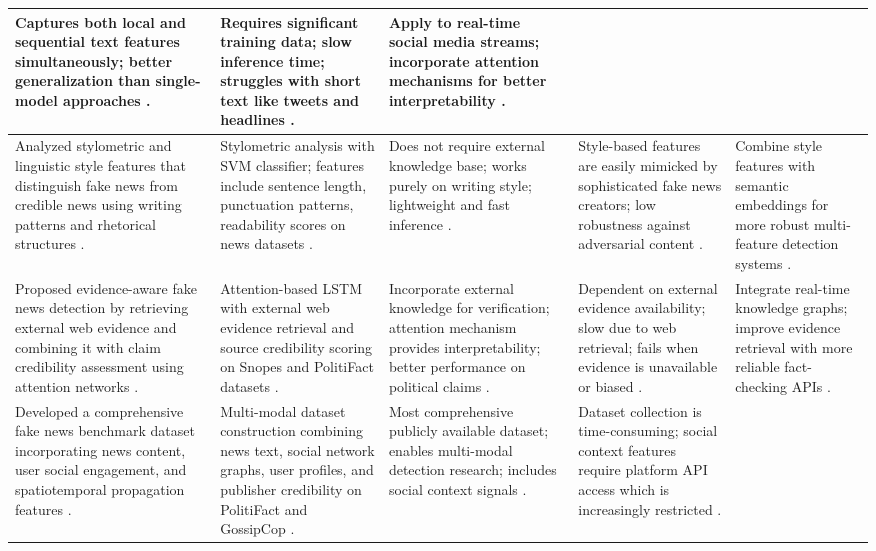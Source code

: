 \begin{longtable}{|p{}|p{}|p{}|p{}|p{}|}
Captures both local and sequential text features simultaneously; better generalization than single-model approaches \cite{Nasir2021FakeNews}. &
Requires significant training data; slow inference time; struggles with short text like tweets and headlines \cite{Nasir2021FakeNews}. &
Apply to real-time social media streams; incorporate attention mechanisms for better interpretability \cite{Nasir2021FakeNews}. \\ \hline
Analyzed stylometric and linguistic style features that distinguish fake news from credible news using writing patterns and rhetorical structures \cite{Przybyla2020Capturing}. &
Stylometric analysis with SVM classifier; features include sentence length, punctuation patterns, readability scores on news datasets \cite{Przybyla2020Capturing}. &
Does not require external knowledge base; works purely on writing style; lightweight and fast inference \cite{Przybyla2020Capturing}. &
Style-based features are easily mimicked by sophisticated fake news creators; low robustness against adversarial content \cite{Przybyla2020Capturing}. &
Combine style features with semantic embeddings for more robust multi-feature detection systems \cite{Przybyla2020Capturing}. \\ \hline
Proposed evidence-aware fake news detection by retrieving external web evidence and combining it with claim credibility assessment using attention networks \cite{Popat2019DeClarE}. &
Attention-based LSTM with external web evidence retrieval and source credibility scoring on Snopes and PolitiFact datasets \cite{Popat2019DeClarE}. &
Incorporate external knowledge for verification; attention mechanism provides interpretability; better performance on political claims \cite{Popat2019DeClarE}. &
Dependent on external evidence availability; slow due to web retrieval; fails when evidence is unavailable or biased \cite{Popat2019DeClarE}. &
Integrate real-time knowledge graphs; improve evidence retrieval with more reliable fact-checking APIs \cite{Popat2019DeClarE}. \\ \hline
Developed a comprehensive fake news benchmark dataset incorporating news content, user social engagement, and spatiotemporal propagation features \cite{Shu2020FakeNewsNet}. &
Multi-modal dataset construction combining news text, social network graphs, user profiles, and publisher credibility on PolitiFact and GossipCop \cite{Shu2020FakeNewsNet}. &
Most comprehensive publicly available dataset; enables multi-modal detection research; includes social context signals \cite{Shu2020FakeNewsNet}. &
Dataset collection is time-consuming; social context features require platform API access which is increasingly restricted \cite{Shu2020FakeNewsNet}. &

\end{longtable}
